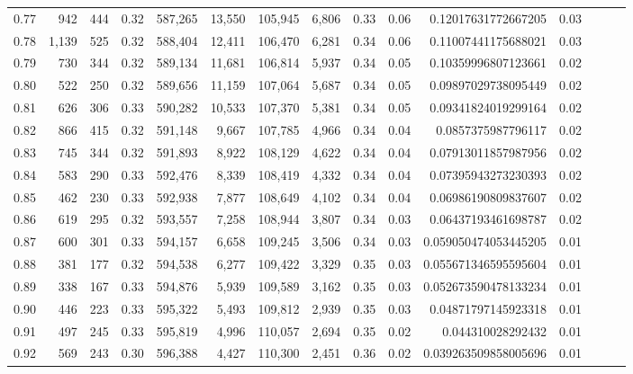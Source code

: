 \begin{tabular}{rrrrrrrrrrrrrrr}
0.77 &     942 &    444 &  0.32 &  587,265 &   13,550 &  105,945 &    6,806 &  0.33 &  0.06 &   0.12017631772667205 &      0.03 \\
0.78 &   1,139 &    525 &  0.32 &  588,404 &   12,411 &  106,470 &    6,281 &  0.34 &  0.06 &   0.11007441175688021 &      0.03 \\
0.79 &     730 &    344 &  0.32 &  589,134 &   11,681 &  106,814 &    5,937 &  0.34 &  0.05 &   0.10359996807123661 &      0.02 \\
0.80 &     522 &    250 &  0.32 &  589,656 &   11,159 &  107,064 &    5,687 &  0.34 &  0.05 &   0.09897029738095449 &      0.02 \\
0.81 &     626 &    306 &  0.33 &  590,282 &   10,533 &  107,370 &    5,381 &  0.34 &  0.05 &   0.09341824019299164 &      0.02 \\
0.82 &     866 &    415 &  0.32 &  591,148 &    9,667 &  107,785 &    4,966 &  0.34 &  0.04 &    0.0857375987796117 &      0.02 \\
0.83 &     745 &    344 &  0.32 &  591,893 &    8,922 &  108,129 &    4,622 &  0.34 &  0.04 &   0.07913011857987956 &      0.02 \\
0.84 &     583 &    290 &  0.33 &  592,476 &    8,339 &  108,419 &    4,332 &  0.34 &  0.04 &   0.07395943273230393 &      0.02 \\
0.85 &     462 &    230 &  0.33 &  592,938 &    7,877 &  108,649 &    4,102 &  0.34 &  0.04 &   0.06986190809837607 &      0.02 \\
0.86 &     619 &    295 &  0.32 &  593,557 &    7,258 &  108,944 &    3,807 &  0.34 &  0.03 &   0.06437193461698787 &      0.02 \\
0.87 &     600 &    301 &  0.33 &  594,157 &    6,658 &  109,245 &    3,506 &  0.34 &  0.03 &  0.059050474053445205 &      0.01 \\
0.88 &     381 &    177 &  0.32 &  594,538 &    6,277 &  109,422 &    3,329 &  0.35 &  0.03 &  0.055671346595595604 &      0.01 \\
0.89 &     338 &    167 &  0.33 &  594,876 &    5,939 &  109,589 &    3,162 &  0.35 &  0.03 &  0.052673590478133234 &      0.01 \\
0.90 &     446 &    223 &  0.33 &  595,322 &    5,493 &  109,812 &    2,939 &  0.35 &  0.03 &   0.04871797145923318 &      0.01 \\
0.91 &     497 &    245 &  0.33 &  595,819 &    4,996 &  110,057 &    2,694 &  0.35 &  0.02 &     0.044310028292432 &      0.01 \\
0.92 &     569 &    243 &  0.30 &  596,388 &    4,427 &  110,300 &    2,451 &  0.36 &  0.02 &  0.039263509858005696 &      0.01 \\

\end{tabular}
